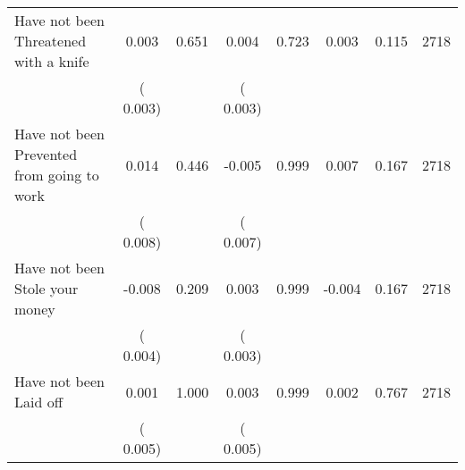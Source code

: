 \begin{tabular}{l*{7}{c}}
 Have not been Threatened with a knife       &              0.003       &        0.651  &              0.004       &        0.723  &              0.003       &              0.115 &  2718 \\ 
                       &       (       0.003)             &                               &       (       0.003)                     &                               &                                               &                                &                      \\ 

 Have not been Prevented from going to work       &              0.014       &        0.446  &             -0.005       &        0.999  &              0.007       &              0.167 &  2718 \\ 
                       &       (       0.008)             &                               &       (       0.007)                     &                               &                                               &                                &                      \\ 

 Have not been Stole your money       &             -0.008       &        0.209  &              0.003       &        0.999  &             -0.004       &              0.167 &  2718 \\ 
                       &       (       0.004)             &                               &       (       0.003)                     &                               &                                               &                                &                      \\ 

 Have not been Laid off       &              0.001       &        1.000  &              0.003       &        0.999  &              0.002       &              0.767 &  2718 \\ 
                       &       (       0.005)             &                               &       (       0.005)                     &                               &                                               &                                &                      \\ 

\hline \end{tabular}